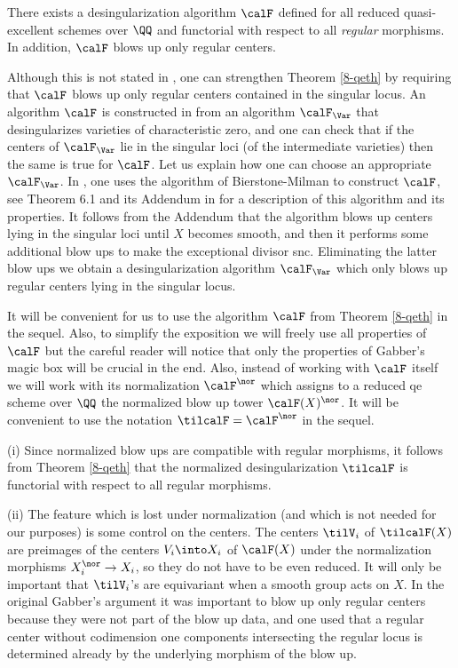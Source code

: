 \documentclass[10pt]{../fichiers-configuration-latex/smfart}
\begin{document}
\begin{theorem2}\label{8-qeth} There exists a desingularization
algorithm $\calF$ defined for all reduced quasi-excellent schemes
over $\QQ$ and functorial with respect to all {\em regular}
morphisms. In addition, $\calF$ blows up only regular centers.
\end{theorem2}

\begin{remark2}
Although this is not stated in \cite{Temkin@qe}, one can strengthen
Theorem \ref{8-qeth} by requiring that $\calF$ blows up only regular centers
contained in the singular locus. An algorithm $\calF$ is constructed in
\cite{Temkin@qe} from an algorithm $\calF_\Var$ that desingularizes varieties
of characteristic zero, and one can check that if the centers of $\calF_\Var$ lie
in the singular loci (of the intermediate varieties) then the same is true
for $\calF$. Let us explain how one can choose an appropriate $\calF_\Var$.
In \cite{Temkin@qe}, one uses the algorithm of Bierstone-Milman to construct $\calF$,
see Theorem 6.1 and its Addendum in \cite{BMT@Bierstone-Milman-Temkin}
for a description of this algorithm and its properties.
It follows from the Addendum that the algorithm blows up centers lying in the
singular loci until $X$ becomes smooth, and then it performs some additional blow ups
to make the exceptional divisor snc. Eliminating the latter blow ups we obtain
a desingularization algorithm $\calF_\Var$ which only blows up regular
centers lying in the singular locus.
\end{remark2}

It will be convenient for us to use the algorithm $\calF$
from Theorem \ref{8-qeth} in the sequel. Also, to simplify the
exposition we will freely use all properties of $\calF$ but the
careful reader will notice that only the properties of Gabber's
magic box will be crucial in the end. Also, instead of working with
$\calF$ itself we will work with its normalization $\calF^\nor$
which assigns to a reduced qe scheme over $\QQ$ the normalized
blow up tower $\calF(X)^\nor$. It will be convenient to use the
notation $\tilcalF=\calF^\nor$ in the sequel.

\begin{remark2}\label{8-qenorth} (i) Since normalized blow ups
are compatible with regular morphisms, it follows from Theorem
\ref{8-qeth} that the normalized desingularization $\tilcalF$
is functorial with respect to all regular morphisms.

(ii) The feature which is lost under normalization (and which is
not needed for our purposes) is some control on the centers. The
centers $\tilV_i$ of $\tilcalF(X)$ are preimages of the centers
$V_i\into X_i$ of $\calF(X)$ under the normalization morphisms
$X_i^\nor\to X_i$, so they do not have to be even reduced. It will
only be important that $\tilV_i$'s are equivariant when a smooth
group acts on $X$. In the original Gabber's argument it was important
to blow up only regular centers because they were not part of the
blow up data, and one used that a regular center without codimension one
components intersecting the regular locus is determined already by the
underlying morphism of the blow up.  \end{remark2}
\end{document}
